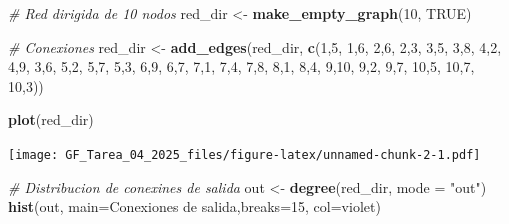 \documentclass[
]{article}
\newenvironment{Shaded}{\begin{snugshade}}{\end{snugshade}}
\newcommand{\AttributeTok}[1]{\textcolor[rgb]{0.13,0.29,0.53}{#1}}
\newcommand{\CommentTok}[1]{\textcolor[rgb]{0.56,0.35,0.01}{\textit{#1}}}
\newcommand{\ConstantTok}[1]{\textcolor[rgb]{0.56,0.35,0.01}{#1}}
\newcommand{\DecValTok}[1]{\textcolor[rgb]{0.00,0.00,0.81}{#1}}
\newcommand{\FunctionTok}[1]{\textcolor[rgb]{0.13,0.29,0.53}{\textbf{#1}}}
\newcommand{\NormalTok}[1]{#1}
\newcommand{\OtherTok}[1]{\textcolor[rgb]{0.56,0.35,0.01}{#1}}
\newcommand{\StringTok}[1]{\textcolor[rgb]{0.31,0.60,0.02}{#1}}
\begin{document}
\begin{Shaded}
\begin{Highlighting}[]
\CommentTok{\# Red dirigida de 10 nodos}
\NormalTok{red\_dir }\OtherTok{\textless{}{-}} \FunctionTok{make\_empty\_graph}\NormalTok{(}\DecValTok{10}\NormalTok{, }\ConstantTok{TRUE}\NormalTok{)}

\CommentTok{\# Conexiones }
\NormalTok{red\_dir }\OtherTok{\textless{}{-}} \FunctionTok{add\_edges}\NormalTok{(red\_dir, }\FunctionTok{c}\NormalTok{(}\DecValTok{1}\NormalTok{,}\DecValTok{5}\NormalTok{, }\DecValTok{1}\NormalTok{,}\DecValTok{6}\NormalTok{, }\DecValTok{2}\NormalTok{,}\DecValTok{6}\NormalTok{, }\DecValTok{2}\NormalTok{,}\DecValTok{3}\NormalTok{, }\DecValTok{3}\NormalTok{,}\DecValTok{5}\NormalTok{, }\DecValTok{3}\NormalTok{,}\DecValTok{8}\NormalTok{, }\DecValTok{4}\NormalTok{,}\DecValTok{2}\NormalTok{, }\DecValTok{4}\NormalTok{,}\DecValTok{9}\NormalTok{, }\DecValTok{3}\NormalTok{,}\DecValTok{6}\NormalTok{, }\DecValTok{5}\NormalTok{,}\DecValTok{2}\NormalTok{, }\DecValTok{5}\NormalTok{,}\DecValTok{7}\NormalTok{, }\DecValTok{5}\NormalTok{,}\DecValTok{3}\NormalTok{, }\DecValTok{6}\NormalTok{,}\DecValTok{9}\NormalTok{, }\DecValTok{6}\NormalTok{,}\DecValTok{7}\NormalTok{, }\DecValTok{7}\NormalTok{,}\DecValTok{1}\NormalTok{, }\DecValTok{7}\NormalTok{,}\DecValTok{4}\NormalTok{, }\DecValTok{7}\NormalTok{,}\DecValTok{8}\NormalTok{, }\DecValTok{8}\NormalTok{,}\DecValTok{1}\NormalTok{, }\DecValTok{8}\NormalTok{,}\DecValTok{4}\NormalTok{, }\DecValTok{9}\NormalTok{,}\DecValTok{10}\NormalTok{, }\DecValTok{9}\NormalTok{,}\DecValTok{2}\NormalTok{, }\DecValTok{9}\NormalTok{,}\DecValTok{7}\NormalTok{, }\DecValTok{10}\NormalTok{,}\DecValTok{5}\NormalTok{, }\DecValTok{10}\NormalTok{,}\DecValTok{7}\NormalTok{, }\DecValTok{10}\NormalTok{,}\DecValTok{3}\NormalTok{))}
 
\FunctionTok{plot}\NormalTok{(red\_dir)}
\end{Highlighting}
\end{Shaded}

\texttt{[image: GF\_Tarea\_04\_2025\_files/figure-latex/unnamed-chunk-2-1.pdf]}

\begin{Shaded}
\begin{Highlighting}[]
\CommentTok{\# Distribucion de conexines de salida}
\NormalTok{out }\OtherTok{\textless{}{-}} \FunctionTok{degree}\NormalTok{(red\_dir, }\AttributeTok{mode =} \StringTok{"out"}\NormalTok{)}
\FunctionTok{hist}\NormalTok{(out, }\AttributeTok{main=}\StringTok{\textquotesingle{}Conexiones de salida\textquotesingle{}}\NormalTok{,}\AttributeTok{breaks=}\DecValTok{15}\NormalTok{, }\AttributeTok{col=}\StringTok{\textquotesingle{}violet\textquotesingle{}}\NormalTok{)}
\end{Highlighting}
\end{Shaded}
\end{document}
